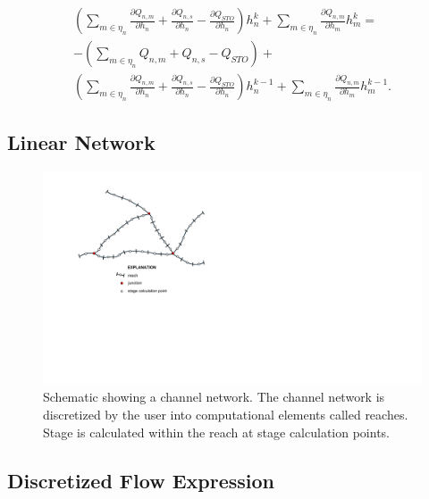\documentclass[fleqn]{article}
\begin{document}
\begin{equation}
\label{eqn:nr-cvfd}
\begin{split}
\left ( \sum\limits_{m \in \eta_{n}} \frac{\partial Q_{n,m}}{\partial h_n} + \frac{\partial Q_{n,s}}{\partial h_n} - \frac{\partial Q_{STO}}{\partial h_n} \right ) h^k_n + 
\sum\limits_{m \in \eta_{n}} \frac{\partial Q_{n,m}}{\partial h_m} h^k_{m} = \\
- \left ( \sum\limits_{m \in \eta_{n}} Q_{n,m} + Q_{n,s} - Q_{STO} \right ) + \\
\left ( \sum\limits_{m \in \eta_{n}} \frac{\partial Q_{n,m}}{\partial h_n} + \frac{\partial Q_{n,s}}{\partial h_n} - \frac{\partial Q_{STO}}{\partial h_n} \right ) h^{k-1}_n + \sum\limits_{m \in \eta_{n}} \frac{\partial Q_{n,m}}{\partial h_m} h^{k-1}_{m}.
\end{split}
\end{equation}

\subsection{Linear Network}

\begin{figure}
	\centering
	\includegraphics[scale=0.9]{figures/channel_network.pdf}
	\caption[Schematic showing a channel network.]{Schematic showing a channel network.  The channel network is discretized by the user into computational elements called reaches.  Stage is calculated within the reach at stage calculation points.}
	\label{fig:channel_network}
\end{figure}


\subsection{Discretized Flow Expression}
\end{document}
